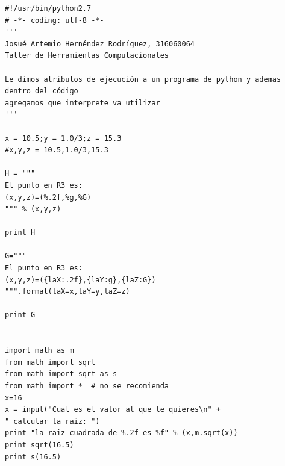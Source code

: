 \documentclass{beamer}
\begin{document}
\begin{frame}[fragile]
	\begin{verbatim}
#!/usr/bin/python2.7 
# -*- coding: utf-8 -*-
'''
Josué Artemio Hernéndez Rodríguez, 316060064
Taller de Herramientas Computacionales

Le dimos atributos de ejecución a un programa de python y ademas dentro del código
agregamos que interprete va utilizar
'''

x = 10.5;y = 1.0/3;z = 15.3
#x,y,z = 10.5,1.0/3,15.3

H = """
El punto en R3 es:
(x,y,z)=(%.2f,%g,%G)
""" % (x,y,z)

print H

G="""
El punto en R3 es:
(x,y,z)=({laX:.2f},{laY:g},{laZ:G})
""".format(laX=x,laY=y,laZ=z)

print G


import math as m
from math import sqrt
from math import sqrt as s
from math import *  # no se recomienda
x=16
x = input("Cual es el valor al que le quieres\n" +
" calcular la raiz: ")
print "la raiz cuadrada de %.2f es %f" % (x,m.sqrt(x))
print sqrt(16.5)
print s(16.5)

	\end{verbatim}
\end{frame}
	
	
\end{document}
